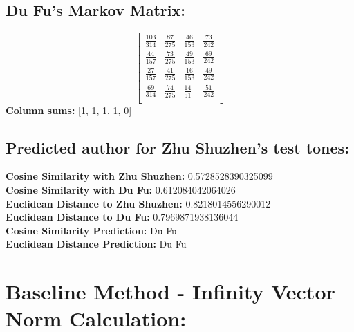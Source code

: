 \documentclass[12pt]{article}
\begin{document}
\subsection*{Du Fu's Markov Matrix:}
\[
\begin{bmatrix}
    \frac{103}{314} & \frac{87}{275} & \frac{46}{153} & \frac{73}{242} \\
    \frac{44}{157} & \frac{73}{275} & \frac{49}{153} & \frac{69}{242} \\
    \frac{27}{157} & \frac{41}{275} & \frac{16}{153} & \frac{49}{242}  \\
    \frac{69}{314} & \frac{74}{275} & \frac{14}{51} & \frac{51}{242}  \\
\end{bmatrix}
\]
\textbf{Column sums:} [1, 1, 1, 1, 0]

\subsection*{Predicted author for Zhu Shuzhen's test tones:}
\textbf{Cosine Similarity with Zhu Shuzhen:} 0.5728528390325099
\\
\textbf{Cosine Similarity with Du Fu:} 0.612084042064026
\\
\textbf{Euclidean Distance to Zhu Shuzhen:} 0.8218014556290012
\\
\textbf{Euclidean Distance to Du Fu:} 0.7969871938136044
\\
\textbf{Cosine Similarity Prediction:} Du Fu
\\
\textbf{Euclidean Distance Prediction:} Du Fu

\section*{Baseline Method - Infinity Vector Norm Calculation: }
\end{document}
